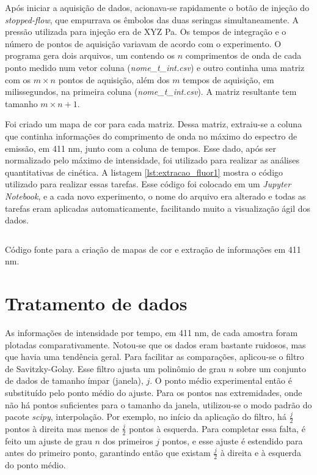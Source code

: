 			Após iniciar a aquisição de dados, acionava-se rapidamente o botão de injeção do \emph{stopped-flow}, que empurrava os êmbolos das duas seringas simultaneamente. A pressão utilizada para injeção era de XYZ Pa. Os tempos de integração e o número de pontos de aquisição variavam de acordo com o experimento. O programa gera dois arquivos, um contendo os $n$ comprimentos de onda de cada ponto medido num vetor coluna (\emph{nome\_t\_int.csv}) e outro continha uma matriz com os $m \times n$ pontos de aquisição, além dos $m$ tempos de aquisição, em milissegundos, na primeira coluna (\emph{nome\_t\_int.csv}). A matriz resultante tem tamanho $m\times n+1$.
			
			Foi criado um mapa de cor para cada matriz. Dessa matriz, extraiu-se a coluna que continha informações do comprimento de onda no máximo do espectro de emissão, em 411 nm, junto com a coluna de tempos. Esse dado, após ser normalizado pelo máximo de intensidade, foi utilizado para realizar as análises quantitativas de cinética. A listagem \ref{lst:extracao_fluor1} mostra o código utilizado para realizar essas tarefas. Esse código foi colocado em um \emph{Jupyter Notebook}, e a cada novo experimento, o nome do arquivo era alterado e todas as tarefas eram aplicadas automaticamente, facilitando muito a visualização ágil dos dados.
			
			\begin{listing}[H]
				\inputminted{python}{./python/fluor_plot_inicial.py}
				\caption{Código fonte para a criação de mapas de cor e extração de informações em 411 nm.}
				\label{lst:extracao_fluor1}
			\end{listing}
			
		\section{Tratamento de dados}
		
			As informações de intensidade por tempo, em 411 nm, de cada amostra foram plotadas comparativamente. Notou-se que os dados eram bastante ruidosos, mas que havia uma tendência geral. Para facilitar as comparações, aplicou-se o filtro de Savitzky-Golay. Esse filtro ajusta um polinômio de grau $n$ sobre um conjunto de dados de tamanho ímpar (janela), $j$. O ponto médio experimental então é substituído pelo ponto médio do ajuste. Para os pontos nas extremidades, onde não há pontos suficientes para o tamanho da janela, utilizou-se o modo padrão do pacote \emph{scipy}, interpolação. Por exemplo, no início da aplicação do filtro, há $\frac{j}{2}$ pontos à direita mas menos de $\frac{j}{2}$ pontos à esquerda. Para completar essa falta, é feito um ajuste de grau $n$ dos primeiros $j$ pontos, e esse ajuste é estendido para antes do primeiro ponto, garantindo então que existam $\frac{j}{2}$ à direita e à esquerda do ponto médio.
			
